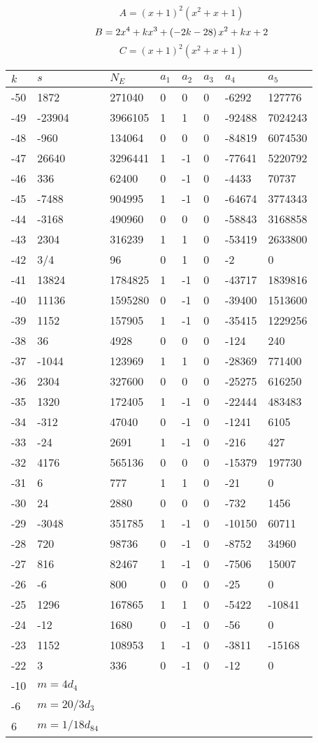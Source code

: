 \documentclass{amsart}
\begin{document}
$$A=(x
 + 1)^{2}(x^2
 + x
 + 1)$$
$$B=2\*x^4
 + k\*x^3
 + \left(-2\*k
 - 28\right) \*x^2
 + k\*x
 + 2$$
$$C=(x
 + 1)^{2}(x^2
 + x
 + 1)$$
\begin{longtable}{|l|l|l|lllll|}
\hline
$k$ & $s$ & $N_E$ & $a_1$ & $a_2$ & $a_3$ & $a_4$ & $a_5$\\
\hline
-50&1872&271040&0&0&0&-6292&127776\\
-49&-23904&3966105&1&1&0&-92488&7024243\\
-48&-960&134064&0&0&0&-84819&6074530\\
-47&26640&3296441&1&-1&0&-77641&5220792\\
-46&336&62400&0&-1&0&-4433&70737\\
-45&-7488&904995&1&-1&0&-64674&3774343\\
-44&-3168&490960&0&0&0&-58843&3168858\\
-43&2304&316239&1&1&0&-53419&2633800\\
-42&3/4&96&0&1&0&-2&0\\
-41&13824&1784825&1&-1&0&-43717&1839816\\
-40&11136&1595280&0&-1&0&-39400&1513600\\
-39&1152&157905&1&-1&0&-35415&1229256\\
-38&36&4928&0&0&0&-124&240\\
-37&-1044&123969&1&1&0&-28369&771400\\
-36&2304&327600&0&0&0&-25275&616250\\
-35&1320&172405&1&-1&0&-22444&483483\\
-34&-312&47040&0&-1&0&-1241&6105\\
-33&-24&2691&1&-1&0&-216&427\\
-32&4176&565136&0&0&0&-15379&197730\\
-31&6&777&1&1&0&-21&0\\
-30&24&2880&0&0&0&-732&1456\\
-29&-3048&351785&1&-1&0&-10150&60711\\
-28&720&98736&0&-1&0&-8752&34960\\
-27&816&82467&1&-1&0&-7506&15007\\
-26&-6&800&0&0&0&-25&0\\
-25&1296&167865&1&1&0&-5422&-10841\\
-24&-12&1680&0&-1&0&-56&0\\
-23&1152&108953&1&-1&0&-3811&-15168\\
-22&3&336&0&-1&0&-12&0\\
-10&$m=4d_{4}$&&\multicolumn{5}{c|}{}\\
-6&$m=20/3d_{3}$&&\multicolumn{5}{c|}{}\\
6&$m=1/18d_{84}$&&\multicolumn{5}{c|}{}\\
\hline
\end{longtable}
\end{document}
